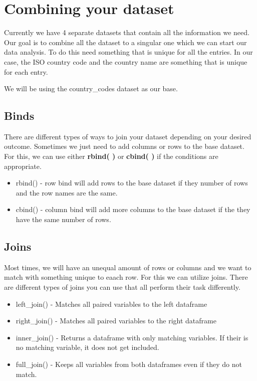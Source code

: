 \documentclass[
]{book}
\begin{document}
\hypertarget{combining-your-dataset}{%
\section{Combining your dataset}\label{combining-your-dataset}}

Currently we have 4 separate datasets that contain all the information we need. Our goal is to combine all the dataset to a singular one which we can start our data analysis. To do this need something that is unique for all the entries. In our case, the ISO country code and the country name are something that is unique for each entry.

We will be using the country\_codes dataset as our base.

\hypertarget{binds}{%
\subsection{Binds}\label{binds}}

There are different types of ways to join your dataset depending on your desired outcome. Sometimes we just need to add columns or rows to the base dataset. For this, we can use either \textbf{rbind( )} or \textbf{cbind( )} if the conditions are appropriate.

\begin{itemize}
\item
  rbind() - row bind will add rows to the base dataset if they number of rows and the row names are the same.
\item
  cbind() - column bind will add more columns to the base dataset if the they have the same number of rows.
\end{itemize}

\hypertarget{joins}{%
\subsection{Joins}\label{joins}}

Most times, we will have an unequal amount of rows or columns and we want to match with something unique to eaach row. For this we can utilize joins. There are different types of joins you can use that all perform their task differently.

\begin{itemize}
\item
  left\_join() - Matches all paired variables to the left dataframe
\item
  right\_join() - Matches all paired variables to the right dataframe
\item
  inner\_join() - Returns a dataframe with only matching variables. If their is no matching variable, it does not get included.
\item
  full\_join() - Keeps all variables from both dataframes even if they do not match.
\end{itemize}
\end{document}
